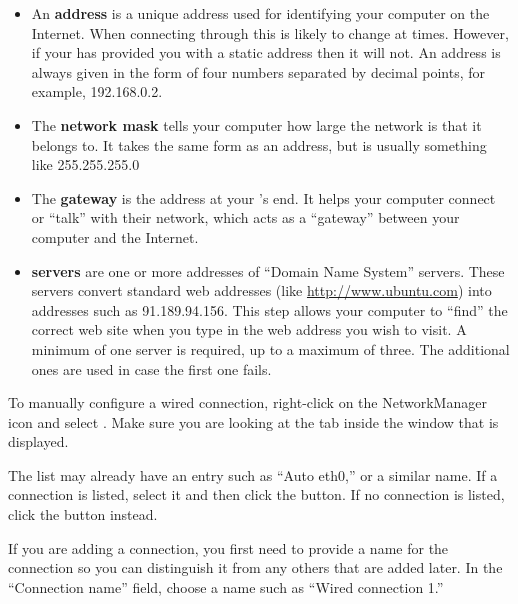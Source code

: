 \begin{itemize}
  \item An \textbf{ address} is a unique address used for identifying your computer on the Internet. When connecting through  this is likely to change at times. However, if your  has provided you with a static address then it will not. An  address is always given in the form of four numbers separated by decimal points, for example, 192.168.0.2.
  \item The \textbf{network mask} tells your computer how large the network is that it belongs to. It takes the same form as an  address, but is usually something like 255.255.255.0
  \item The \textbf{gateway} is the  address at your 's end. It helps your computer connect or ``talk'' with their network, which acts as a ``gateway'' between your computer and the Internet.
  \item \textbf{ servers} are one or more  addresses of 
    ``Domain Name System'' servers. These servers convert standard web addresses (like \url{http://www.ubuntu.com}) into  addresses such as 91.189.94.156. This step allows your computer to ``find'' the correct web site when you type in the web address you wish to visit. A minimum of one  server is required,  up to a maximum of three. The additional ones are used in case the first one fails.
\end{itemize}

To manually configure a wired connection, right-click on the NetworkManager
icon and select . Make sure you are looking at
the  tab inside the  window that is displayed.

The list may already have an entry such as ``Auto eth$0$,'' or a similar name. If a connection is listed, select it and then click the  button. If no connection is listed, click the 
button instead.

If you are adding a connection, you first need to provide a name for the connection so you can distinguish it from any others that are added later. In the ``Connection name'' field, choose a name such as ``Wired connection 1.'' 


